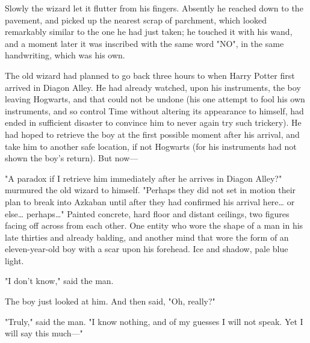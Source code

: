 Slowly the wizard let it flutter from his fingers. Absently he reached down to
the pavement, and picked up the nearest scrap of parchment, which looked
remarkably similar to the one he had just taken; he touched it with his wand,
and a moment later it was inscribed with the same word "NO", in the same
handwriting, which was his own.

The old wizard had planned to go back three hours to when Harry Potter first
arrived in Diagon Alley. He had already watched, upon his instruments, the boy
leaving Hogwarts, and that could not be undone (his one attempt to fool his own
instruments, and so control Time without altering its appearance to himself,
had ended in sufficient disaster to convince him to never again try such
trickery). He had hoped to retrieve the boy at the first possible moment after
his arrival, and take him to another safe location, if not Hogwarts (for his
instruments had not shown the boy's return). But now---

"A paradox if I retrieve him immediately after he arrives in Diagon Alley?"
murmured the old wizard to himself. "Perhaps they did not set in motion their
plan to break into Azkaban until after they had confirmed his arrival here{\ldots} or
else{\ldots} perhaps{\ldots}"
\later
Painted concrete, hard floor and distant ceilings, two figures facing off
across from each other. One entity who wore the shape of a man in his late
thirties and already balding, and another mind that wore the form of an
eleven-year-old boy with a scar upon his forehead. Ice and shadow, pale blue
light.

"I don't know," said the man.

The boy just looked at him. And then said, "Oh, really?"

"Truly," said the man. "I know nothing, and of my guesses I will not speak. Yet
I will say this much---"
